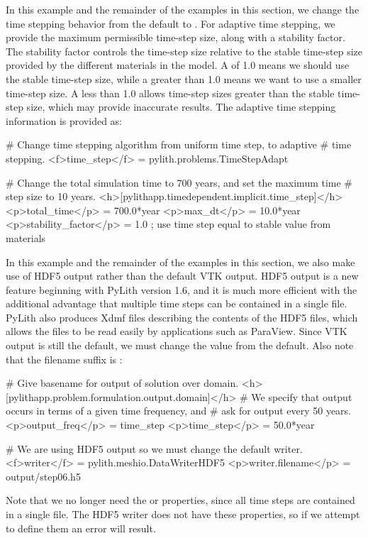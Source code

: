 In this example and the remainder of the examples in this section,
we change the time stepping behavior from the default 
to . For adaptive time stepping, we provide
the maximum permissible time-step size, along with a stability factor.
The stability factor controls the time-step size relative to the stable
time-step size provided by the different materials in the model. A
 of 1.0 means we should use the stable time-step
size, while a  greater than 1.0 means we
want to use a smaller time-step size. A 
less than 1.0 allows time-step sizes greater than the stable time-step
size, which may provide inaccurate results. The adaptive time stepping
information is provided as:
\begin{cfg}
# Change time stepping algorithm from uniform time step, to adaptive
# time stepping.
<f>time_step</f> = pylith.problems.TimeStepAdapt

# Change the total simulation time to 700 years, and set the maximum time
# step size to 10 years.
<h>[pylithapp.timedependent.implicit.time_step]</h>
<p>total_time</p> = 700.0*year
<p>max_dt</p> = 10.0*year
<p>stability_factor</p> = 1.0 ; use time step equal to stable value from materials
\end{cfg}
In this example and the remainder of the examples in this section,
we also make use of HDF5 output rather than the default VTK output.
HDF5 output is a new feature beginning with PyLith version 1.6, and
it is much more efficient with the additional advantage that multiple
time steps can be contained in a single file. PyLith also produces
Xdmf files describing the contents of the HDF5 files, which allows
the files to be read easily by applications such as ParaView. Since
VTK output is still the default, we must change the value from the
default. Also note that the filename suffix is :
\begin{cfg}
# Give basename for output of solution over domain.
<h>[pylithapp.problem.formulation.output.domain]</h>
# We specify that output occurs in terms of a given time frequency, and
# ask for output every 50 years.
<p>output_freq</p> = time_step
<p>time_step</p> = 50.0*year

# We are using HDF5 output so we must change the default writer.
<f>writer</f> = pylith.meshio.DataWriterHDF5
<p>writer.filename</p> = output/step06.h5  
\end{cfg}
Note that we no longer need the  or
 properties, since all time steps are
contained in a single file. The HDF5 writer does not have these
properties, so if we attempt to define them an error will result.

